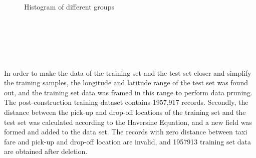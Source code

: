   \begin{figure}[htbp]
    \centering
    \caption{Histogram of different groups}
    \end{figure}
  


\\
\\
\\
\\
\\
\newpage
In order to make the data of the training set and the test set closer and simplify the training samples, the longitude and latitude range of the test set was found out, and the training set data was framed in this range to perform data pruning. 
The post-construction training dataset contains 1957,917 records. 
Secondly, the distance between the pick-up and drop-off locations of the training set and the test set was calculated according to the Haversine Equation, and a new field was formed and added to the data set. The records with zero distance between taxi fare and pick-up and drop-off location are invalid, and 1957913 training set data are obtained after deletion.


